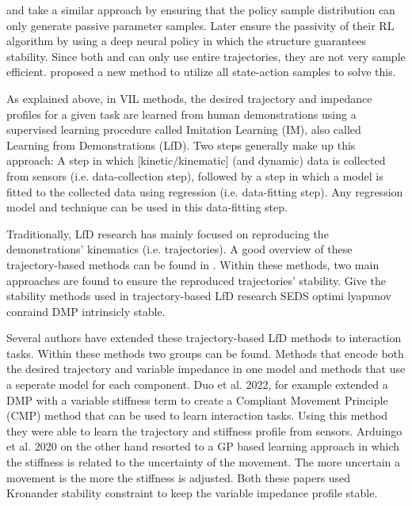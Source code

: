\cite{reyLearningMotionsDemonstrations2018} and \cite{khaderStabilityGuaranteedReinforcementLearning2020} take a similar approach by ensuring that the policy sample distribution can only generate passive parameter samples. Later \cite{khaderLearningDeepEnergy2021} ensure the passivity of their RL algorithm by using a deep neural policy in which the structure guarantees stability. Since both \cite{khaderStabilityGuaranteedReinforcementLearning2020,reyLearningMotionsDemonstrations2018} and \cite{khaderLearningDeepEnergy2021}can only use entire trajectories, they are not very sample efficient. \cite{khaderLearningStableNormalizingFlow2021} proposed a new method to utilize all state-action samples to solve this.

As explained above, in VIL methods, the desired trajectory and impedance profiles for a given task are learned from human demonstrations using a supervised learning procedure called Imitation Learning (IM), also called Learning from Demonstrations (LfD). Two steps generally make up this approach: A step in which [kinetic/kinematic] (and dynamic) data is collected from sensors (i.e. data-collection step), followed by a step in which a model is fitted to the collected data using regression (i.e. data-fitting step). Any regression model and technique can be used in this data-fitting step.

Traditionally, LfD research has mainly focused on reproducing the demonstrations' kinematics (i.e. trajectories). A good overview of these trajectory-based methods can be found in \cite{siReviewManipulationSkill2021}. Within these methods, two main approaches are found to ensure the reproduced trajectories' stability.
Give the stability methods used in trajectory-based LfD research
SEDS optimi lyapunov conraind
DMP intrinsicly stable.

Several authors have extended these trajectory-based LfD methods to interaction tasks. Within these methods two groups can be found. Methods that encode both the desired trajectory and variable impedance in one model and methods that use a seperate model for each component.
Duo et al. 2022, for example \cite{douRobotSkillLearning2022} extended a DMP with a variable stiffness term to create a Compliant Movement Principle (CMP) method that can be used to learn interaction tasks. Using this method they were able to learn the trajectory and stiffness profile from sensors. Arduingo et al. 2020 on the other hand resorted to a GP based learning approach in which the stiffness is related to the uncertainty of the movement. The more uncertain a movement is the more the stiffness is adjusted. Both these papers used Kronander stability constraint to keep the variable impedance profile stable.

